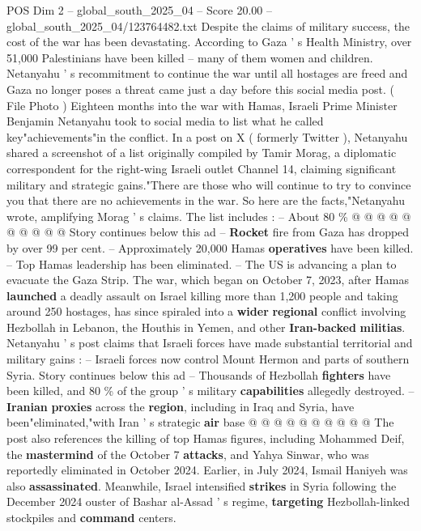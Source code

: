 \begin{textsample}{POS Dim 2 – global\_south\_2025\_04 – Score 20.00 – global\_south\_2025\_04/123764482.txt}  \label{ex:f2_pos_341}
Despite the claims of military success, the cost of the war has been devastating.
According to Gaza ' s Health Ministry, over 51,000 Palestinians have been killed -- many of them women and children.
Netanyahu ' s recommitment to continue the war until all hostages are freed and Gaza no longer poses a threat came just a day before this social media post. ( File Photo ) Eighteen months into the war with Hamas, Israeli Prime Minister Benjamin Netanyahu took to social media to list what he called key"achievements"in the conflict.
In a post on X ( formerly Twitter ), Netanyahu shared a screenshot of a list originally compiled by Tamir Morag, a diplomatic correspondent for the right-wing Israeli outlet Channel 14, claiming significant military and strategic gains."There are those who will continue to try to convince you that there are no achievements in the war.
So here are the facts,"Netanyahu wrote, amplifying Morag ' s claims.
The list includes : -- About 80 \% @ @ @ @ @ @ @ @ @ @ Story continues below this ad -- \textbf{Rocket} fire from Gaza has dropped by over 99 per cent. -- Approximately 20,000 Hamas \textbf{operatives} have been killed. -- Top Hamas leadership has been eliminated. -- The US is advancing a plan to evacuate the Gaza Strip.
The war, which began on October 7, 2023, after Hamas \textbf{launched} a deadly assault on Israel killing more than 1,200 people and taking around 250 hostages, has since spiraled into a \textbf{wider} \textbf{regional} conflict involving Hezbollah in Lebanon, the Houthis in Yemen, and other \textbf{Iran-backed} \textbf{militias}.
Netanyahu ' s post claims that Israeli forces have made substantial territorial and military gains : -- Israeli forces now control Mount Hermon and parts of southern Syria.
Story continues below this ad -- Thousands of Hezbollah \textbf{fighters} have been killed, and 80 \% of the group ' s military \textbf{capabilities} allegedly destroyed. -- \textbf{Iranian} \textbf{proxies} across the \textbf{region}, including in Iraq and Syria, have been"eliminated,"with Iran ' s strategic \textbf{air} base @ @ @ @ @ @ @ @ @ @ The post also references the killing of top Hamas figures, including Mohammed Deif, the \textbf{mastermind} of the October 7 \textbf{attacks}, and Yahya Sinwar, who was reportedly eliminated in October 2024.
Earlier, in July 2024, Ismail Haniyeh was also \textbf{assassinated}.
Meanwhile, Israel intensified \textbf{strikes} in Syria following the December 2024 ouster of Bashar al-Assad ' s regime, \textbf{targeting} Hezbollah-linked stockpiles and \textbf{command} centers.

\end{textsample}

